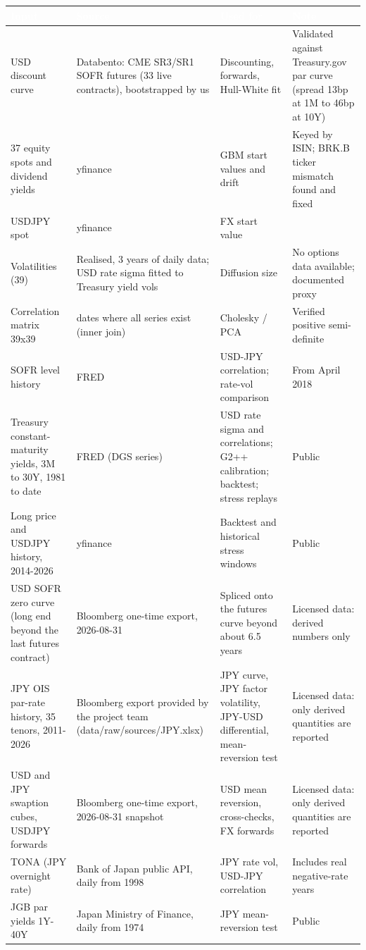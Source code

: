 \documentclass[11pt,letterpaper]{article}
\begin{document}
{\scriptsize\setlength{\LTpre}{4pt}\setlength{\LTpost}{6pt}
\begin{longtable}{>{\raggedright\arraybackslash}p{}>{\raggedright\arraybackslash}p{}>{\raggedright\arraybackslash}p{}>{\raggedright\arraybackslash}p{}}
\toprule
\rowcolor{navy}\textbf{\textcolor{white}{Input}} & \textbf{\textcolor{white}{Source}} & \textbf{\textcolor{white}{Used for}} & \textbf{\textcolor{white}{Note}} \\
\endhead
USD discount curve & Databento: CME SR3/SR1 SOFR futures (33 live contracts), bootstrapped by us & Discounting, forwards, Hull-White fit & Validated against Treasury.gov par curve (spread 13bp at 1M to 46bp at 10Y) \\
\rowcolor{gray!9}37 equity spots and dividend yields & yfinance & GBM start values and drift & Keyed by ISIN; BRK.B ticker mismatch found and fixed \\
USDJPY spot & yfinance & FX start value &  \\
\rowcolor{gray!9}Volatilities (39) & Realised, 3 years of daily data; USD rate sigma fitted to Treasury yield vols & Diffusion size & No options data available; documented proxy \\
Correlation matrix 39x39 & 616 dates where all series exist (inner join) & Cholesky / PCA & Verified positive semi-definite \\
\rowcolor{gray!9}SOFR level history & FRED & USD-JPY correlation; rate-vol comparison & From April 2018 \\
Treasury constant-maturity yields, 3M to 30Y, 1981 to date & FRED (DGS series) & USD rate sigma and correlations; G2++ calibration; backtest; stress replays & Public \\
\rowcolor{gray!9}Long price and USDJPY history, 2014-2026 & yfinance & Backtest and historical stress windows & Public \\
USD SOFR zero curve (long end beyond the last futures contract) & Bloomberg one-time export, 2026-08-31 & Spliced onto the futures curve beyond about 6.5 years & Licensed data: derived numbers only \\
\rowcolor{gray!9}JPY OIS par-rate history, 35 tenors, 2011-2026 & Bloomberg export provided by the project team (data/raw/sources/JPY.xlsx) & JPY curve, JPY factor volatility, JPY-USD differential, mean-reversion test & Licensed data: only derived quantities are reported \\
USD and JPY swaption cubes, USDJPY forwards & Bloomberg one-time export, 2026-08-31 snapshot & USD mean reversion, cross-checks, FX forwards & Licensed data: only derived quantities are reported \\
\rowcolor{gray!9}TONA (JPY overnight rate) & Bank of Japan public API, daily from 1998 & JPY rate vol, USD-JPY correlation & Includes real negative-rate years \\
JGB par yields 1Y-40Y & Japan Ministry of Finance, daily from 1974 & JPY mean-reversion test & Public \\
\bottomrule
\end{longtable}}
\end{document}
